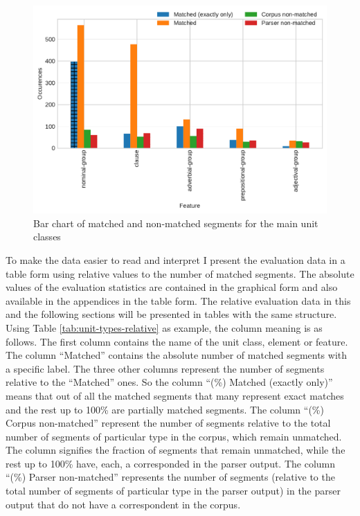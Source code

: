     
    \begin{figure}[!ht]
    \centering
    \includegraphics[width=.85\textwidth]{evaluation-results/figures/unit-types-data.pdf}
    \caption{Bar chart of matched and non-matched segments for the main unit classes}
    \label{fig:unit-types-data}
    \end{figure}
    
    To make the data easier to read and interpret I present the evaluation data in a table form using relative values to the number of matched segments. The absolute values of the evaluation statistics are contained in the graphical form and also available in the appendices in the table form. The relative evaluation data in this and the following sections will be presented in tables with the same structure. Using Table \ref{tab:unit-types-relative} as example, the column meaning is as follows. The first column contains the name of the unit class, element or feature. The column ``Matched'' contains the absolute number of matched segments with a specific label. The three other columns represent the number of segments relative to the ``Matched'' ones. So the column ``(\%) Matched (exactly only)'' means that out of all the matched segments that many represent exact matches and the rest up to 100\% are partially matched segments. The column ``(\%) Corpus non-matched'' represent the number of segments relative to the total number of segments of particular type in the corpus, which remain unmatched. The column signifies the fraction of segments that remain unmatched, while the rest up to 100\% have, each, a corresponded in the parser output. The column ``(\%) Parser non-matched'' represents the number of segments (relative to the total number of segments of particular type in the parser output) in the parser output that do not have a correspondent in the corpus.
    
